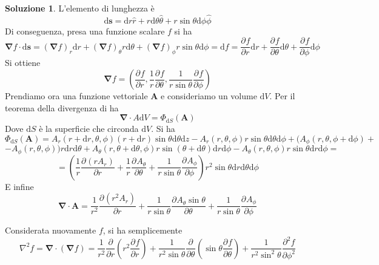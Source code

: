 \documentclass[a4paper,11pt]{book}
\newcommand{\dif}{\mathrm{d}}
\newcommand{\der}[3][]{\frac{\partial ^{#1}#2}{\partial {#3}^{#1}}}
\let\oldnabla\nabla
\renewcommand{\nabla}{\vec{\oldnabla}}
\newcommand{\lap}{\oldnabla^2}
\renewcommand{\vec}[1]{\mathbf{#1}}
\theoremstyle{theorem}
\theoremstyle{definition}
\newtheorem{soluzione}{Soluzione}[section]
\begin{document}
\begin{soluzione}
	L'elemento di lunghezza è
	\[\dif\vec{s}=\dif r\hat{r}+r\dif\theta\hat{\theta}+r\sin\theta\dif \phi\hat{\phi}\]
	Di conseguenza, presa una funzione scalare $f$ si ha
	\[\nabla f\cdot\dif\vec{s}=\left(\nabla f\right)_r\dif r+\left(\nabla f\right)_\theta r\dif\theta+\left(\nabla f\right)_\phi r\sin\theta\dif \phi=\dif f=\der{f}{r}\dif r+\der{f}{\theta}\dif \theta+\der{f}{\phi}\dif \phi\]
	Si ottiene
	\[\nabla f=\left(\der{f}{r},\frac{1}{r}\der{f}{\theta},\frac{1}{r\sin\theta}\der{f}{\phi}\right)\]
	Prendiamo ora una funzione vettoriale $\vec{A}$ e consideriamo un volume $\dif V$. Per il teorema della divergenza di ha
	\[\nabla\cdot A\dif V=\Phi_{\dif S}(\vec{A})\]
	Dove $\dif S$ è la superficie che circonda $\dif V$. Si ha
	\[\Phi_{\dif S}(\vec{A})=A_r(r+\dif r,\theta,\phi)(r+\dif r)\sin\theta\dif\theta\dif z-A_r(r,\theta,\phi)r\sin\theta\dif\theta\dif \phi+(A_\phi(r,\theta,\phi+\dif \phi)+\]\[-A_\phi(r,\theta,\phi))r\dif r\dif\theta+A_\theta(r,\theta+\dif\theta,\phi)r\sin(\theta+\dif\theta)\dif r\dif\phi-A_\theta(r,\theta,\phi)r\sin\theta\dif r\dif \phi=\]\[=\left(\frac{1}{r}\der{(rA_r)}{r}+\frac{1}{r}\der{A_\theta}{\theta}+\frac{1}{r\sin\theta}\der{A_\phi}{\phi}\right)r^2\sin\theta\dif r\dif\theta\dif \phi\]
	E infine\[\nabla\cdot\vec{A}=\frac{1}{r^2}\der{(r^2A_r)}{r}+\frac{1}{r\sin\theta}\der{A_\theta\sin\theta}{\theta}+\frac{1}{r\sin\theta}\der{A_\phi}{\phi}\]
	
	Considerata nuovamente $f$, si ha semplicemente
	\[\lap f=\nabla\cdot\left(\nabla f\right)=\frac{1}{r^2}\frac{\partial}{\partial r}\left(r^2\der{f}{r}\right)+\frac{1}{r^2\sin\theta}\der{}{\theta}\left(\sin\theta\der{f}{\theta}\right)+\frac{1}{r^2\sin^2\theta}\der[2]{f}{\phi}\]
\end{soluzione}
\newpage
\end{document}
